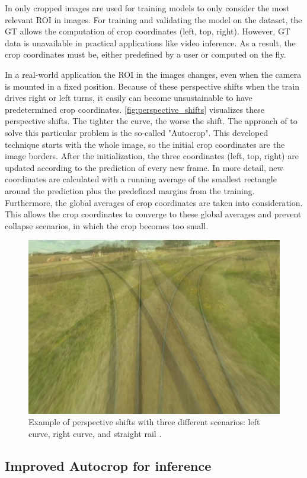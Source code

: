 In \cite{tepNet2024} only cropped images are used for training models to only consider the most relevant \ac{ROI} in images.
For training and validating the model on the dataset, the \ac{GT} allows the computation of crop coordinates (left, top, right).
However, \ac{GT} data is unavailable in practical applications like video inference.
As a result, the crop coordinates must be, either predefined by a user or computed on the fly.

In a real-world application the ROI in the images changes, even when the camera is mounted in a fixed position.
Because of these perspective shifts when the train drives right or left turns, it easily can become unsustainable to have predetermined crop coordinates.
\autoref{fig:perspective_shifts} visualizes these perspective shifts.
The tighter the curve, the worse the shift.
The approach of \cite{tepNet2024} to solve this particular problem is the so-called "Autocrop".
This developed technique starts with the whole image, so the initial crop coordinates are the image borders.
After the initialization, the three coordinates (left, top, right) are updated according to the prediction of every new frame.
In more detail, new coordinates are calculated with a running average of the smallest rectangle around the prediction plus the predefined margins from the training.
Furthermore, the global averages of crop coordinates are taken into consideration.
This allows the crop coordinates to converge to these global averages and prevent collapse scenarios, in which the crop becomes too small.


\begin{figure}[H]
    \centering
    \includegraphics[width=0.6\linewidth]{PICs/Baselinepaper/perspective_shifts.jpg}
    \caption{Example of perspective shifts with three different scenarios: left curve, right curve, and straight rail \cite{tepNet2024}.}
    \label{fig:perspective_shifts}
\end{figure}

\subsection{Improved Autocrop for inference}
\label{sec:imporvedAutocrop}

